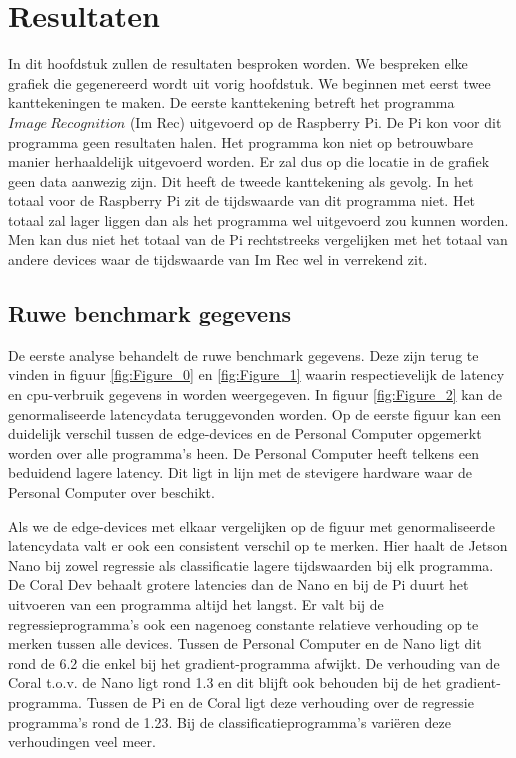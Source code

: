 \chapter{Resultaten} \label{ch:resultaten}

In dit hoofdstuk zullen de resultaten besproken worden. We bespreken elke grafiek die gegenereerd wordt uit vorig hoofdstuk. We beginnen met eerst twee kanttekeningen te maken. De eerste kanttekening betreft het programma $Image~Recognition$ (Im Rec) uitgevoerd op de Raspberry Pi. De Pi kon voor dit programma geen resultaten halen. Het programma kon niet op betrouwbare manier herhaaldelijk uitgevoerd worden. Er zal dus op die locatie in de grafiek geen data aanwezig zijn. Dit heeft de tweede kanttekening als gevolg. In het totaal voor de Raspberry Pi zit de tijdswaarde van dit programma niet. Het totaal zal lager liggen dan als het programma wel uitgevoerd zou kunnen worden. Men kan dus niet het totaal van de Pi rechtstreeks vergelijken met het totaal van andere devices waar de tijdswaarde van Im Rec wel in verrekend zit.

\newpage

	\section{Ruwe benchmark gegevens}
	De eerste analyse behandelt de ruwe benchmark gegevens. Deze zijn terug te vinden in figuur \ref{fig:Figure_0} en \ref{fig:Figure_1} waarin respectievelijk de latency en \gls{cpu}-verbruik gegevens in worden weergegeven. In figuur \ref{fig:Figure_2} kan de genormaliseerde latencydata teruggevonden worden. Op de eerste figuur kan een duidelijk verschil tussen de edge-devices en de Personal Computer opgemerkt worden over alle programma's heen. De Personal Computer heeft telkens een beduidend lagere latency. Dit ligt in lijn met de stevigere hardware waar de Personal Computer over beschikt. 
	
	Als we de edge-devices met elkaar vergelijken op de figuur met genormaliseerde latencydata valt er ook een consistent verschil op te merken. Hier haalt de Jetson Nano bij zowel regressie als classificatie lagere tijdswaarden bij elk programma. De Coral Dev behaalt grotere latencies dan de Nano en bij de Pi duurt het uitvoeren van een programma altijd het langst. Er valt bij de regressieprogramma's ook een nagenoeg constante relatieve verhouding op te merken tussen alle devices. Tussen de Personal Computer en de Nano ligt dit rond de 6.2 die enkel bij het gradient-programma afwijkt. De verhouding van de Coral t.o.v. de Nano ligt rond 1.3 en dit blijft ook behouden bij de het gradient-programma. Tussen de Pi en de Coral ligt deze verhouding over de regressie programma's rond de 1.23. Bij de classificatieprogramma's vari\"eren deze verhoudingen veel meer. 
	

